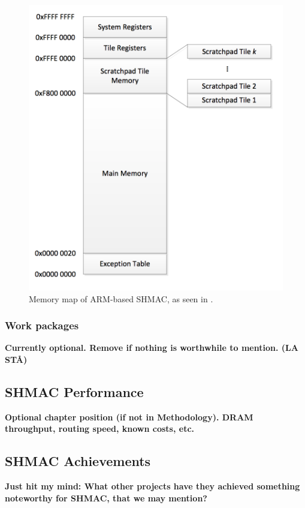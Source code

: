 \begin{figure}[htb]
    \centering
    \includegraphics[width=1.0\textwidth]{Figures/Heterogeneous/SHMACMemory}
    \caption{Memory map of ARM-based SHMAC, as seen in \cite{shmac-plan}.}
    \label{fig:shmac-memory}
\end{figure}


\subsubsection{Work packages}
\textbf{Currently optional. Remove if nothing is worthwhile to mention. (LA STÅ)}

\subsection{SHMAC Performance}
\textbf{Optional chapter position (if not in Methodology). DRAM throughput, routing speed, known costs, etc.}

\subsection{SHMAC Achievements}
\textbf{Just hit my mind: What other projects have they achieved something noteworthy for SHMAC, that we may mention?}

